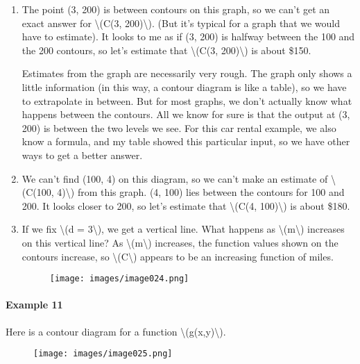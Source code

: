 \begin{enumerate}
\item
  The point (3, 200) is between contours on this graph, so we can't get
  an exact answer for \textbackslash{}(C(3, 200)\textbackslash{}). (But
  it's typical for a graph that we would have to estimate). It looks to
  me as if (3, 200) is halfway between the 100 and the 200 contours, so
  let's estimate that \textbackslash{}(C(3, 200)\textbackslash{}) is
  about \$150.

  Estimates from the graph are necessarily very rough. The graph only
  shows a little information (in this way, a contour diagram is like a
  table), so we have to extrapolate in between. But for most graphs, we
  don't actually know what happens between the contours. All we know for
  sure is that the output at (3, 200) is between the two levels we see.
  For this car rental example, we also know a formula, and my table
  showed this particular input, so we have other ways to get a better
  answer.
\item
  We can't find (100, 4) on this diagram, so we can't make an estimate
  of \textbackslash{}(C(100, 4)\textbackslash{}) from this graph. (4,
  100) lies between the contours for 100 and 200. It looks closer to
  200, so let's estimate that \textbackslash{}(C(4,
  100)\textbackslash{}) is about \$180.
\item
  If we fix \textbackslash{}(d = 3\textbackslash{}), we get a vertical
  line. What happens as \textbackslash{}(m\textbackslash{}) increases on
  this vertical line? As \textbackslash{}(m\textbackslash{}) increases,
  the function values shown on the contours increase, so
  \textbackslash{}(C\textbackslash{}) appears to be an increasing
  function of miles.

  \begin{figure}
  \centering
  \texttt{[image: images/image024.png]}
  \caption{}
  \end{figure}
\end{enumerate}

\hypertarget{example-11}{%
\paragraph{Example 11}\label{example-11}}

Here is a contour diagram for a function
\textbackslash{}(g(x,y)\textbackslash{}).

\begin{figure}
\centering
\texttt{[image: images/image025.png]}
\caption{}
\end{figure}

